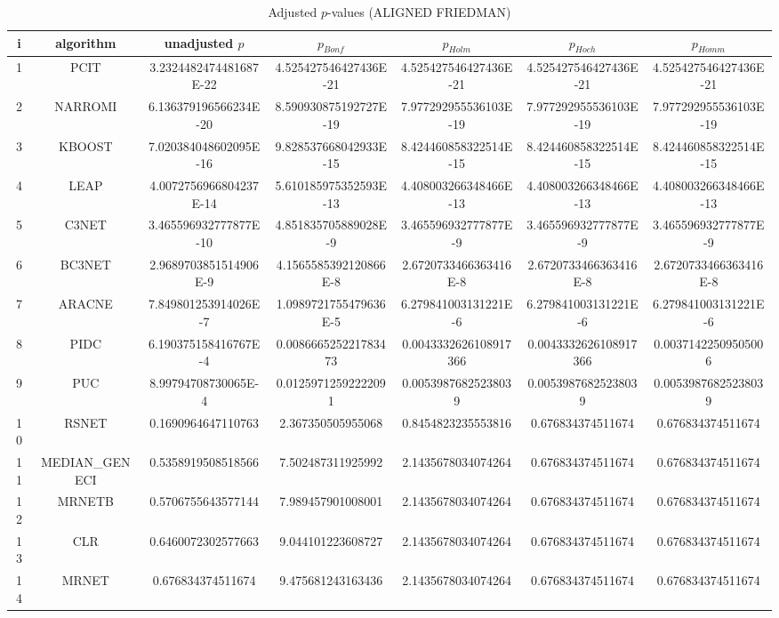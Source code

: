 \documentclass[a4paper,10pt]{article}
\begin{document}
\begin{landscape}
\begin{table}[!htp]
\centering\scriptsize
\caption{Adjusted $p$-values (ALIGNED FRIEDMAN)}
\begin{tabular}{ccccccc}
i&algorithm&unadjusted $p$&$p_{Bonf}$&$p_{Holm}$&$p_{Hoch}$&$p_{Homm}$\\
\hline
1&PCIT&3.2324482474481687E-22&4.525427546427436E-21&4.525427546427436E-21&4.525427546427436E-21&4.525427546427436E-21\\
2&NARROMI&6.136379196566234E-20&8.590930875192727E-19&7.977292955536103E-19&7.977292955536103E-19&7.977292955536103E-19\\
3&KBOOST&7.020384048602095E-16&9.828537668042933E-15&8.424460858322514E-15&8.424460858322514E-15&8.424460858322514E-15\\
4&LEAP&4.0072756966804237E-14&5.610185975352593E-13&4.408003266348466E-13&4.408003266348466E-13&4.408003266348466E-13\\
5&C3NET&3.465596932777877E-10&4.851835705889028E-9&3.465596932777877E-9&3.465596932777877E-9&3.465596932777877E-9\\
6&BC3NET&2.9689703851514906E-9&4.1565585392120866E-8&2.6720733466363416E-8&2.6720733466363416E-8&2.6720733466363416E-8\\
7&ARACNE&7.849801253914026E-7&1.0989721755479636E-5&6.279841003131221E-6&6.279841003131221E-6&6.279841003131221E-6\\
8&PIDC&6.190375158416767E-4&0.008666525221783473&0.0043332626108917366&0.0043332626108917366&0.00371422509505006\\
9&PUC&8.99794708730065E-4&0.01259712592222091&0.00539876825238039&0.00539876825238039&0.00539876825238039\\
10&RSNET&0.1690964647110763&2.367350505955068&0.8454823235553816&0.676834374511674&0.676834374511674\\
11&MEDIAN_GENECI&0.5358919508518566&7.502487311925992&2.1435678034074264&0.676834374511674&0.676834374511674\\
12&MRNETB&0.5706755643577144&7.989457901008001&2.1435678034074264&0.676834374511674&0.676834374511674\\
13&CLR&0.6460072302577663&9.044101223608727&2.1435678034074264&0.676834374511674&0.676834374511674\\
14&MRNET&0.676834374511674&9.475681243163436&2.1435678034074264&0.676834374511674&0.676834374511674\\
\hline
\end{tabular}
\end{table}


\end{landscape}
\end{document}

